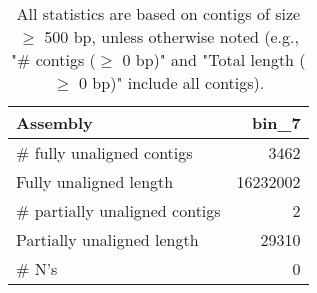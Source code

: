 \documentclass[12pt,a4paper]{article}
\begin{document}
\begin{table}[ht]
\begin{center}
\caption{All statistics are based on contigs of size $\geq$ 500 bp, unless otherwise noted (e.g., "\# contigs ($\geq$ 0 bp)" and "Total length ($\geq$ 0 bp)" include all contigs).}
\begin{tabular}{|l*{1}{|r}|}
\hline
Assembly & bin\_7 \\ \hline
\# fully unaligned contigs & 3462 \\ \hline
Fully unaligned length & 16232002 \\ \hline
\# partially unaligned contigs & 2 \\ \hline
Partially unaligned length & 29310 \\ \hline
\# N's & 0 \\ \hline
\end{tabular}
\end{center}
\end{table}
\end{document}

